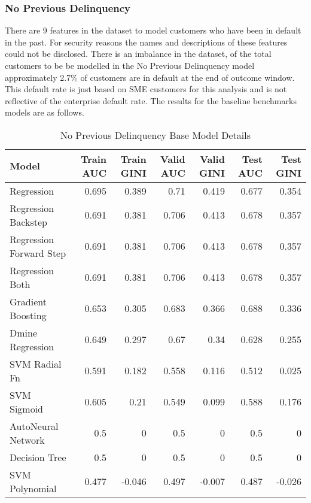 \subsubsection{No Previous Delinquency}

There are 9 features in the dataset to model customers who have been in default in the past. For security reasons the names and descriptions of these features could not be disclosed. There is an imbalance in the dataset, of the total customers to be be modelled in the No Previous Delinquency model approximately 2.7\% of customers are in default at the end of outcome window. This default rate is just based on SME customers for this analysis and is not reflective of the enterprise default rate. The results for the baseline benchmarks models are as follows.

\begin{table}[H]
	\centering
	\resizebox{\textwidth}{!}
	{
		\begin{tabular}{l | r | r| r |r| r|r}
			\hline
			\textbf{Model} & \textbf{Train AUC} & \textbf{Train GINI} & \textbf{Valid AUC} & \textbf{Valid GINI}& \textbf{Test AUC} & \textbf{Test GINI}\\
			\hline
			\cellcolor{green!25}Regression & \cellcolor{green!25}0.695 & \cellcolor{green!25}0.389 & \cellcolor{green!25}0.71 & \cellcolor{green!25}0.419 & \cellcolor{green!25}0.677 & \cellcolor{green!25}0.354 \\
			Regression Backstep & 0.691 & 0.381 & 0.706 & 0.413 & 0.678 & 0.357 \\
			Regression Forward Step & 0.691 & 0.381 & 0.706 & 0.413 & 0.678 & 0.357 \\
			Regression Both & 0.691 & 0.381 & 0.706 & 0.413 & 0.678 & 0.357 \\
			Gradient Boosting & 0.653 & 0.305 & 0.683 & 0.366 & 0.688 & 0.336 \\
			Dmine Regression & 0.649 & 0.297 & 0.67 & 0.34 & 0.628 & 0.255 \\
			SVM Radial Fn & 0.591 & 0.182 & 0.558 & 0.116 & 0.512 & 0.025 \\
			SVM Sigmoid & 0.605 & 0.21 & 0.549 & 0.099 & 0.588 & 0.176 \\
			AutoNeural Network & 0.5 & 0 & 0.5 & 0 & 0.5 & 0 \\
			Decision Tree & 0.5 & 0 & 0.5 & 0 & 0.5 & 0 \\
			SVM Polynomial & 0.477 & -0.046 & 0.497 & -0.007 & 0.487 & -0.026 \\
			\hline
		\end{tabular}
	}
	\caption{No Previous Delinquency Base Model Details}
	\label{table:NoPreviousDelinquencyBaseModelDetails}
\end{table}

